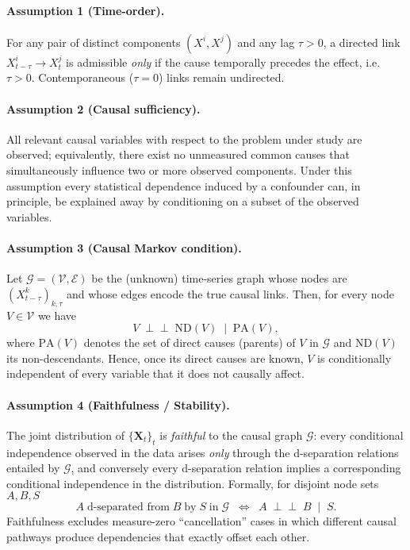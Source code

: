 \documentclass[14pt]{extarticle}
\begin{document}
	\paragraph*{Assumption 1 (Time-order).}  
	For any pair of distinct components $(X^{i},X^{j})$ and any lag $\tau>0$, a directed link $X^{i}_{t-\tau}\rightarrow X^{j}_{t}$ is admissible \emph{only} if the cause temporally precedes the effect, i.e.\ $\tau>0$. Contemporaneous ($\tau=0$) links remain undirected.  
	
	\paragraph*{Assumption 2 (Causal sufficiency).}  
	All relevant causal variables with respect to the problem under study are observed; equivalently, there exist no unmeasured common causes that simultaneously influence two or more observed components.  Under this assumption every statistical dependence induced by a confounder can, in principle, be explained away by conditioning on a subset of the observed variables.  
	
	\paragraph*{Assumption 3 (Causal Markov condition).}  
	Let $\mathcal G=(\mathcal V,\mathcal E)$ be the (unknown) time-series graph whose nodes are $(X^k_{t-\tau})_{k,\tau}$ and whose edges encode the true causal links.  Then, for every node $V\in\mathcal V$ we have  
	$$
	V\;\perp\!\!\!\perp\;\text{ND}(V)\;\mid\;\mathrm{PA}(V),
	$$
	where $\mathrm{PA}(V)$ denotes the set of direct causes (parents) of $V$ in $\mathcal G$ and $\text{ND}(V)$ its non-descendants.  Hence, once its direct causes are known, $V$ is conditionally independent of every variable that it does not causally affect.  
	
	\paragraph*{Assumption 4 (Faithfulness / Stability).}  
	The joint distribution of $\{\mathbf X_t\}_{t}$ is \emph{faithful} to the causal graph $\mathcal G$: every conditional independence observed in the data arises \emph{only} through the d-separation relations entailed by $\mathcal G$, and conversely every d-separation relation implies a corresponding conditional independence in the distribution.  Formally, for disjoint node sets $A,B,S$  
	$$
	A\;\text{d-separated from}\;B\;\text{by}\;S\;\text{in}\;\mathcal G
	\;\;\Longleftrightarrow\;\;
	A\;\perp\!\!\!\perp\;B\;\mid\;S .
	$$
	Faithfulness excludes measure-zero “cancellation” cases in which different causal pathways produce dependencies that exactly offset each other.  
	
\end{document}
